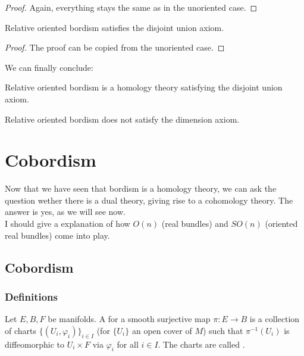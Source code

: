 \documentclass[a4paper,11pt]{article}
\begin{document}
\begin{proof}\cite{conner}
    Again, everything stays the same as in the unoriented case.
\end{proof}

\begin{lemma}
    Relative oriented bordism satisfies the disjoint union axiom.
\end{lemma}

\begin{proof}
    The proof can be copied from the unoriented case.
\end{proof}

We can finally conclude:
\begin{theorem}
    Relative oriented bordism is a homology theory satisfying the disjoint union axiom.
\end{theorem}

\begin{observation}
    Relative oriented bordism does not satisfy the dimension axiom.
\end{observation}


\section{Cobordism}
Now that we have seen that bordism is a homology theory, we can ask the question wether there is a dual theory, giving rise to a cohomology theory. The answer is yes, as we will see now.\\
I should give a explanation of how \(O(n)\) (real bundles) and \(SO(n)\) (oriented real bundles) come into play.

\subsection{Cobordism}

\subsubsection{Definitions}

\begin{definition}
    Let \(E,B,F\) be manifolds. A  for a smooth surjective map \(\pi:E\to B\) is a collection of charts \(\{(U_i,\varphi_i)\}_{i\in I}\) (for \(\{U_i\}\) an open cover of \(M\)) such that \(\pi^{-1}(U_i)\) is diffeomorphic to \(U_i\times F\) via \(\varphi_i\) for all \(i\in I\). The charts are called .
\end{definition}
\end{document}
